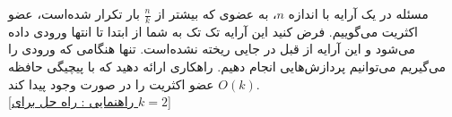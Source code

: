 ‌مسئله
در یک آرایه با اندازه $n$، به عضوی که بیشتر از $ \frac{n}{k} $ بار تکرار شده‌است، عضو اکثریت می‌گوییم. فرض کنید این آرایه تک تک به شما از ابتدا تا انتها ورودی داده می‌شود و این آرایه از قبل در جایی ریخته نشده‌است. تنها هنگامی که ورودی را می‌گیریم می‌توانیم پردازش‌هایی انجام دهیم. راهکاری ارائه دهید که با پیچیگی حافظه 
$O(k)$
عضو اکثریت را در صورت وجود پیدا کند.\\ 
	\href{https://www.geeksforgeeks.org/majority-element/}{
[راهنمایی : راه حل برای
 $k = 2$]}













